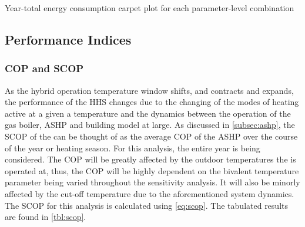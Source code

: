 \begin{table}[htb]
    \footnotesize
    \centering
    \caption{Year-total energy consumption carpet plot for each parameter-level combination}
    \label{tbl:totalconsump}
\end{table}


\subsection{Performance Indices}
\subsubsection{COP and SCOP}
As the hybrid operation temperature window shifts, and contracts and expands, the performance of the \ac{HHS} changes due to the changing of the modes of heating active at a given a temperature and the dynamics between the operation of the gas boiler, \ac{ASHP} and building model at large. As discussed in \cref{subsec:ashp}, the \ac{SCOP} of the \HP can be thought of as the average \ac{COP} of the \ac{ASHP} over the course of the year or heating season. For this analysis, the entire year is being considered. The \ac{COP} will be greatly affected by the outdoor temperatures the \HP is operated at, thus, the \ac{COP} will be highly dependent on the bivalent temperature parameter being varied throughout the sensitivity analysis. It will also be minorly affected by the cut-off temperature due to the aforementioned system dynamics. The \ac{SCOP} for this analysis is calculated using \cref{eq:scop}. The tabulated results are found in \cref{tbl:scop}.

